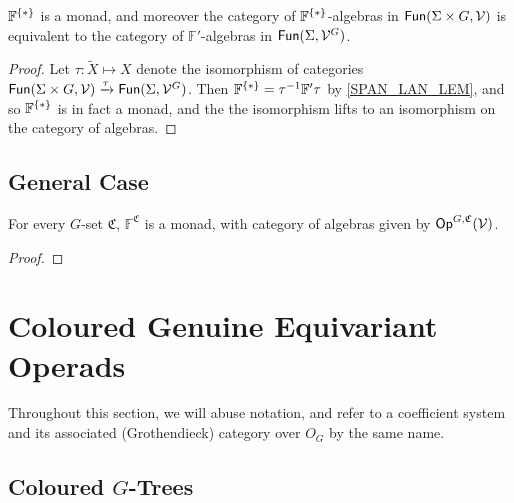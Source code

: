 \documentclass[psamsfonts,onesided,10pt
,draft
]{amsart}%
\begin{document}
\begin{proposition}
      $\mathbb F^{\set{\**}}$ is a monad, and moreover
      the category of $\mathbb F^{\set{\**}}$-algebras in $\mathsf{Fun}(\Sigma \times G, \mathcal V)$ is equivalent to
      the category of $\mathbb F'$-algebras in $\mathsf{Fun}(\Sigma, \mathcal V^G)$.
\end{proposition}
\begin{proof}
      Let $\tau: \tilde X \mapsto X$ denote the isomorphism of categories
      $\mathsf{Fun}(\Sigma \times G, \mathcal V) \xrightarrow{\tau} \mathsf{Fun}(\Sigma, \mathcal V^G)$.
      Then $\mathbb F^{\set{\**}} = \tau^{-1} \mathbb F' \tau$ by \ref{SPAN_LAN_LEM}, and so
      $\mathbb F^{\set{\**}}$ is in fact a monad, and the
      the isomorphism lifts to an isomorphism on the category of algebras.
\end{proof}


\subsection{General Case}

\begin{theorem}
      For every $G$-set $\mathfrak C$, $\mathbb F^{\mathfrak C}$ is a monad, with category of algebras given by $\mathsf{Op}^{G,\mathfrak C}(\mathcal V)$. 
\end{theorem}
\begin{proof}
\end{proof}






\newpage

\section{Coloured Genuine Equivariant Operads}

Throughout this section, we will abuse notation, and refer to
a coefficient system and its associated (Grothendieck) category over $O_G$ by the same name.

\subsection{Coloured $G$-Trees}

\newcommand{\CS}{\underline{\mathfrak C} \Sigma_G}
\newcommand{\CO}{\underline{\mathfrak C} \Omega_G}
\end{document}
